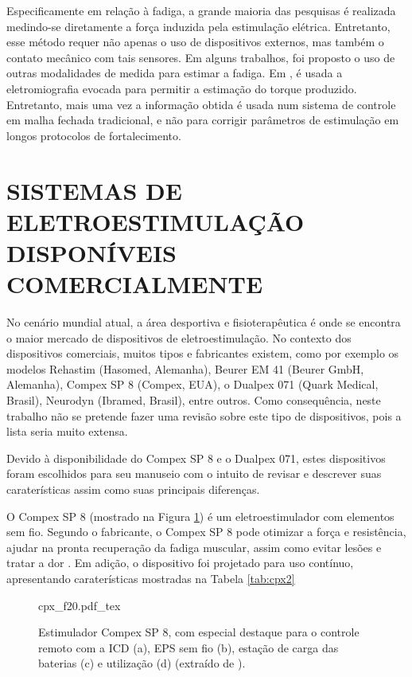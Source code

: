 Especificamente em relação à fadiga, a grande maioria das pesquisas é realizada medindo-se diretamente a força induzida pela estimulação elétrica. Entretanto, esse método requer não apenas o uso de dispositivos externos, mas também o contato mecânico com tais sensores. Em alguns trabalhos, foi proposto o uso de outras modalidades de medida para estimar a fadiga. Em \cite{Zhang2011FES-inducedTracking}, é usada a eletromiografia evocada para permitir a estimação do torque produzido. Entretanto, mais uma vez a informação obtida é usada num sistema de controle em malha fechada tradicional, e não para corrigir parâmetros de estimulação em longos protocolos de fortalecimento.

\section{SISTEMAS DE ELETROESTIMULAÇÃO DISPONÍVEIS COMERCIALMENTE}
No cenário mundial atual, a área desportiva e fisioterapêutica é onde se encontra o maior mercado de dispositivos de eletroestimulação. No contexto dos dispositivos comerciais, muitos tipos e fabricantes existem, como por exemplo os modelos Rehastim (Hasomed, Alemanha), Beurer EM 41 (Beurer GmbH, Alemanha), Compex SP 8 (Compex, EUA), o Dualpex 071 (Quark Medical, Brasil), Neurodyn (Ibramed, Brasil), entre outros.  Como consequência, neste trabalho não se pretende fazer uma revisão sobre este tipo de dispositivos, pois a lista seria muito extensa. 

Devido à disponibilidade do Compex SP 8 e o Dualpex 071, estes dispositivos foram escolhidos para seu manuseio com o intuito de revisar e descrever suas caraterísticas assim como suas principais diferenças.

O Compex SP 8 (mostrado na Figura \ref{fig:cpx_f20}) é um eletroestimulador com elementos sem fio. Segundo o fabricante, o Compex SP 8 pode otimizar a força e resistência, ajudar na pronta recuperação da fadiga muscular, assim como evitar lesões e tratar a dor \cite{R2012CompexUse}. Em adição, o dispositivo foi projetado para uso contínuo, apresentando caraterísticas mostradas na Tabela \ref{tab:cpx2} %

\begin{figure}[h]
    \centering %
    \small %
    \def\svgwidth{1
    \columnwidth}%
    {cpx_f20.pdf_tex}
    \caption{Estimulador Compex SP 8, com especial destaque para o controle remoto com a ICD (a), EPS sem fio (b), estação de carga das baterias (c) e utilização (d) (extraído de \cite{R2012CompexUse}).}
    \label{fig:cpx_f20}
\end{figure}

